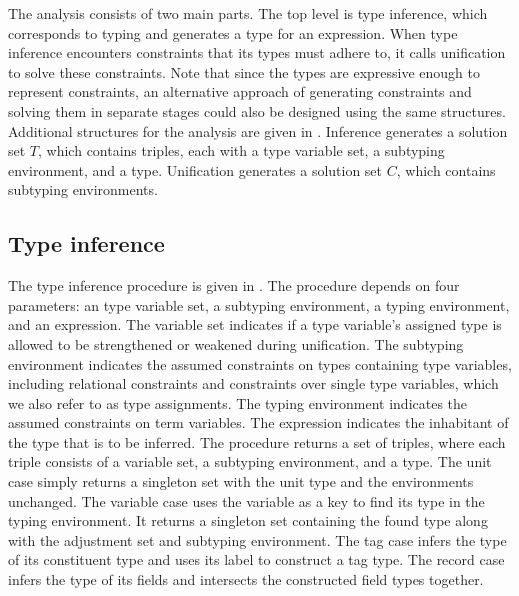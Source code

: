\documentclass[acmsmall]{acmart}
\begin{document}
The analysis consists of two main parts. The top level is type inference, which corresponds to typing
and generates a type for an expression. When type inference encounters constraints that its types must adhere to,
it calls unification to solve these constraints. Note that since the types are expressive enough to represent constraints,
an alternative approach of generating constraints and solving them in separate stages could also be designed 
using the same structures. Additional structures for the analysis are given in . 
Inference generates a solution set $T$, which contains triples, each with a type variable set, a subtyping environment, and a type.  
Unification generates a solution set $C$, which contains subtyping environments. 



\subsection{Type inference}
The type inference procedure is given in .
The procedure depends on four parameters: an type variable set, a subtyping environment, 
a typing environment, and an expression.
The variable set indicates if a type variable's assigned type is allowed to be strengthened or weakened  
during unification.
The subtyping environment indicates the assumed constraints on types containing type variables,
including relational constraints and constraints over single type variables, 
which we also refer to as type assignments.
The typing environment indicates the assumed constraints on term variables.
The expression indicates the inhabitant of the type that is to be inferred.
The procedure returns a set of triples, where each triple consists of a variable set, a subtyping environment,
and a type.
The unit case simply returns a singleton set with the unit type and the environments unchanged. 
The variable case uses the variable as a key to find its type in the typing environment. 
It returns a singleton set containing the found type along with the adjustment set and subtyping environment.
The tag case infers the type of its constituent type and uses its label to construct a tag type.
The record case infers the type of its fields and intersects the constructed field types together.
\end{document}
